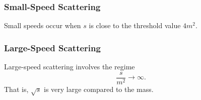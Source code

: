 \subsubsection{Small-Speed Scattering}
Small speeds occur when $s$ is close to the threshold value $4 m^{2}$.
\subsubsection{Large-Speed Scattering}
Large-speed scattering involves the regime
\begin{equation}
	\frac{s}{m^{2}} \rightarrow \infty.
\end{equation}
That is, $\sqrt{s}$ is very large compared to the mass.
